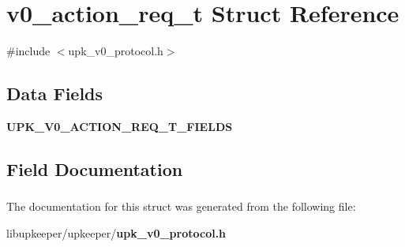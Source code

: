 \section{v0\_\-action\_\-req\_\-t Struct Reference}
\label{structv0__action__req__t}


{\ttfamily \#include $<$upk\_\-v0\_\-protocol.h$>$}

\subsection*{Data Fields}
\begin{DoxyCompactItemize}
\item 
{\bf UPK\_\-V0\_\-ACTION\_\-REQ\_\-T\_\-FIELDS}
\end{DoxyCompactItemize}


\subsection{Field Documentation}
\subsubsection[{UPK\_\-V0\_\-ACTION\_\-REQ\_\-T\_\-FIELDS}]{}\label{structv0__action__req__t_ae9c899a5861482f133d826ef9a2556bf}


The documentation for this struct was generated from the following file:\begin{DoxyCompactItemize}
\item 
libupkeeper/upkeeper/{\bf upk\_\-v0\_\-protocol.h}\end{DoxyCompactItemize}
